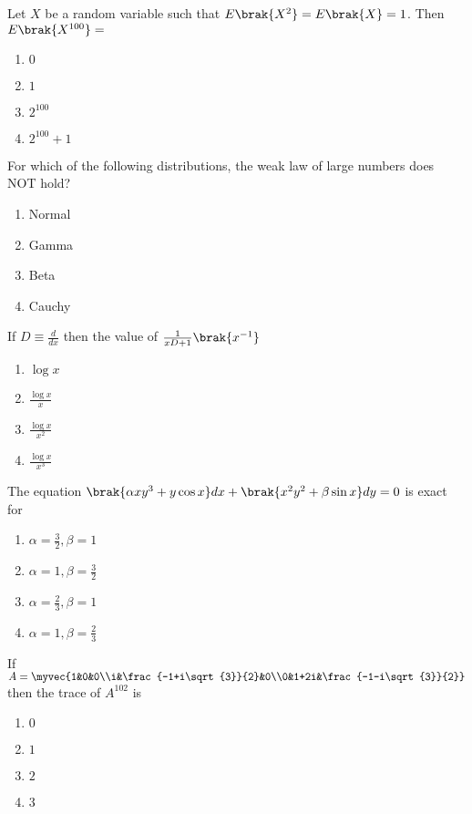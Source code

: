 \item{
Let $X$ be a random variable such that $E\brak{X^2}=E\brak{X}=1$. Then $E\brak{X^{100}}=$
\begin{multicols}{4}
\begin{enumerate}
\item $0$
\item $1$
\item $2^{100}$
\item $2^{100}+1$
\end{enumerate}
\end{multicols}
}
\item{
For which of the following distributions, the weak law of large numbers does NOT hold?
\begin{multicols}{4}
\begin{enumerate}
\item Normal
\item Gamma
\item Beta
\item Cauchy
\end{enumerate}
\end{multicols}
}
\item{
If $D\equiv\frac{d}{dx}$ then the value of $\frac{1}{xD+1}\brak{x^{-1}}$
\begin{multicols}{4}
\begin{enumerate}
\item $\log{x}$
\item $\frac{\log{x}}{x}$
\item $\frac{\log{x}}{x^2}$
\item $\frac{\log{x}}{x^3}$
\end{enumerate}
\end{multicols}
}
\item{
The equation $\brak{\alpha xy^3+y\cos x}dx+\brak{x^2y^2+\beta\sin x}dy=0$ is exact for
\begin{multicols}{4}
\begin{enumerate}
\item $\alpha=\frac{3}{2},\beta=1$
\item $\alpha=1,\beta=\frac{3}{2}$
\item $\alpha=\frac{2}{3},\beta=1$
\item $\alpha=1,\beta=\frac{2}{3}$
\end{enumerate}
\end{multicols}
}
\item{
If $A=\myvec{1&0&0\\i&\frac{-1+i\sqrt{3}}{2}&0\\0&1+2i&\frac{-1-i\sqrt{3}}{2}}$ then the trace of $A^{102}$ is 
\begin{multicols}{4}
\begin{enumerate}
\item $0$
\item $1$
\item $2$
\item $3$
\end{enumerate}
\end{multicols}
}
